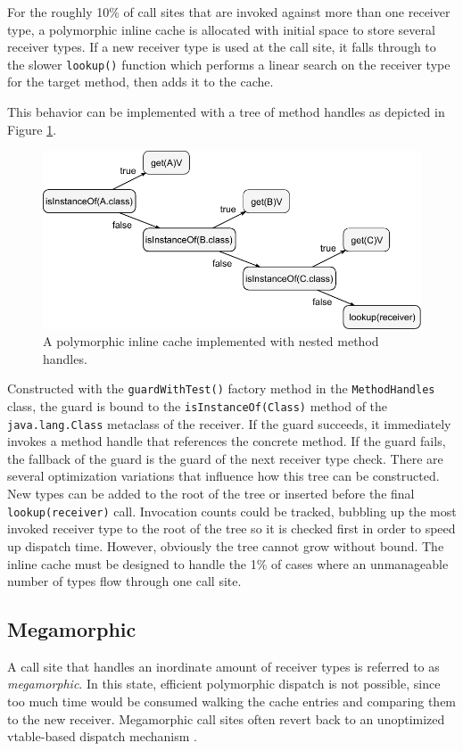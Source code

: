 \smallskip

For the roughly 10\% of call sites that are invoked against more than one receiver type, a polymorphic inline cache is allocated with initial space to store several receiver types.  If a new receiver type is used at the call site, it falls through to the slower \texttt{lookup()} function which performs a linear search on the receiver type for the target method, then adds it to the cache.

This behavior can be implemented with a tree of method handles as depicted in Figure \ref{fig:guard-pic}.

\begin{figure}[htbp]
	\centering
    \includegraphics[width=\textwidth]{./Figures/guard-pic.pdf}
	\caption[Method Handle PIC]{A polymorphic inline cache implemented with nested method handles.}
  \label{fig:guard-pic}
\end{figure}

Constructed with the \texttt{guardWithTest()} factory method in the \texttt{MethodHandles} class, the guard is bound to the \texttt{isInstanceOf(Class)} method of the \texttt{java.lang.Class} metaclass of the receiver.  If the guard succeeds, it immediately invokes a method handle that references the concrete method.  If the guard fails, the fallback of the guard is the guard of the next receiver type check.  There are several optimization variations that influence how this tree can be constructed.  New types can be added to the root of the tree or inserted before the final \texttt{lookup(receiver)} call.  Invocation counts could be tracked, bubbling up the most invoked receiver type to the root of the tree so it is checked first in order to speed up dispatch time.  However, obviously the tree cannot grow without bound.  The inline cache must be designed to handle the 1\% of cases where an unmanageable number of types flow through one call site.

\subsection{Megamorphic}

A call site that handles an inordinate amount of receiver types is referred to as \emph{megamorphic}.  In this state, efficient polymorphic dispatch is not possible, since too much time would be consumed walking the cache entries and comparing them to the new receiver.  Megamorphic call sites often revert back to an unoptimized vtable-based dispatch mechanism  \cite{hotspot-compiledcall}.
